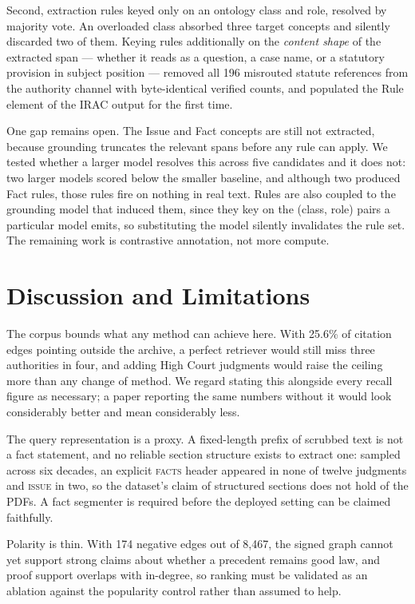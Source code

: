 \documentclass[10pt,conference]{IEEEtran}
\begin{document}
Second, extraction rules keyed only on an ontology class and role, resolved by majority vote.
An overloaded class absorbed three target concepts and silently discarded two of them. Keying
rules additionally on the \emph{content shape} of the extracted span --- whether it reads as a
question, a case name, or a statutory provision in subject position --- removed all 196
misrouted statute references from the authority channel with byte-identical verified counts,
and populated the Rule element of the IRAC output for the first time.

One gap remains open. The Issue and Fact concepts are still not extracted, because grounding
truncates the relevant spans before any rule can apply. We tested whether a larger model
resolves this across five candidates and it does not: two larger models scored below the
smaller baseline, and although two produced Fact rules, those rules fire on nothing in real
text. Rules are also coupled to the grounding model that induced them, since they key on the
(class, role) pairs a particular model emits, so substituting the model silently invalidates
the rule set. The remaining work is contrastive annotation, not more compute.

\section{Discussion and Limitations}

The corpus bounds what any method can achieve here. With 25.6\% of citation edges pointing
outside the archive, a perfect retriever would still miss three authorities in four, and
adding High Court judgments would raise the ceiling more than any change of method. We regard
stating this alongside every recall figure as necessary; a paper reporting the same numbers
without it would look considerably better and mean considerably less.

The query representation is a proxy. A fixed-length prefix of scrubbed text is not a fact
statement, and no reliable section structure exists to extract one: sampled across six
decades, an explicit \textsc{facts} header appeared in none of twelve judgments and
\textsc{issue} in two, so the dataset's claim of structured sections does not hold of the
PDFs. A fact segmenter is required before the deployed setting can be claimed faithfully.

Polarity is thin. With 174 negative edges out of 8{,}467, the signed graph cannot yet support
strong claims about whether a precedent remains good law, and proof support overlaps with
in-degree, so ranking must be validated as an ablation against the popularity control rather
than assumed to help.
\end{document}
